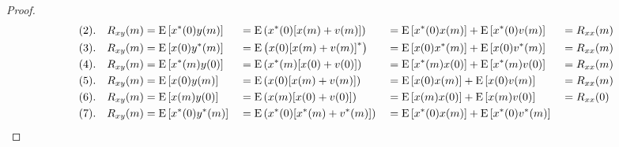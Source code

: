 \begin{proof}
\begin{align*}
    (2).\quad\Rxy(m)
       &\eqd \pE\brs{\rvx^\ast(0)\rvy(m)}
      &&\eqd \pE\brp{\rvx^\ast(0)\brs{\rvx(m)+\rvv(m)}}
      &&=    \pE\brs{\rvx^\ast(0)\rvx(m)} + \pE\brs{\rvx^\ast(0)                       \rvv(m)}
      &&=    \Rxx(m)
     \\
    (3).\quad\Rxy(m)
       &\eqd \pE\brs{\rvx(0)\rvy^\ast(m)}
      &&\eqd \pE\brp{\rvx(0)\brs{\rvx(m)+\rvv(m)}^\ast}
      &&=    \pE\brs{\rvx(0)\rvx^\ast(m)} + \pE\brs{\rvx(0)                       \rvv^\ast(m)}
      &&=    \Rxx(m)
     \\
    (4).\quad\Rxy(m)
      &\eqd \pE\brs{\rvx^\ast(m)\rvy(0)}
      &&\eqd \pE\brp{\rvx^\ast(m)\brs{\rvx(0)+\rvv(0)}}
      &&=    \pE\brs{\rvx^\ast(m)\rvx(0)} + \pE\brs{\rvx^\ast(m)                       \rvv(0)}
      &&=    \Rxx(m)
     \\
    (5).\quad\Rxy(m)
      &\eqd \pE\brs{\rvx(0)\rvy(m)}
      &&\eqd \pE\brp{\rvx(0)\brs{\rvx(m)+\rvv(m)}}
      &&=    \pE\brs{\rvx(0)\rvx(m)} + \pE\brs{\rvx(0)                       \rvv(m)}
      &&=    \Rxx(m)
     \\
    (6).\quad\Rxy(m)
      &\eqd \pE\brs{\rvx(m)\rvy(0)}
      &&\eqd \pE\brp{\rvx(m)\brs{\rvx(0)+\rvv(0)}}
      &&=    \pE\brs{\rvx(m)\rvx(0)} + \pE\brs{\rvx(m)                       \rvv(0)}
      &&=    \Rxx(0)
    \\
    (7).\quad\Rxy(m)
      &\eqd \pE\brs{\rvx^\ast(0)\rvy^\ast(m)}
      &&\eqd \pE\brp{\rvx^\ast(0)\brs{\rvx^\ast(m)+\rvv^\ast(m)}}
      &&=    \pE\brs{\rvx^\ast(0)\rvx(m)} + \pE\brs{\rvx^\ast(0)                       \rvv^\ast(m)}

\end{align*}
\end{proof}
